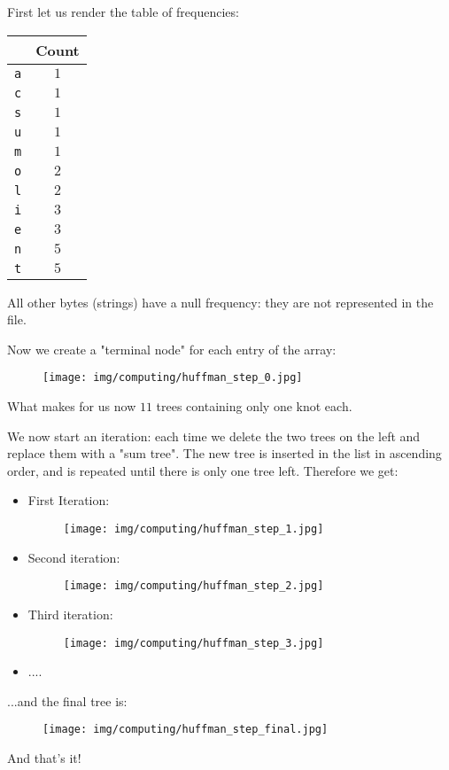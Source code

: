 	First let us render the table of frequencies:
	\begin{table}[H]
		\centering
		\begin{tabular}{|c|c|}
		\hline
		\rowcolor[HTML]{9B9B9B} 
		\multicolumn{1}{|l|}{\cellcolor[HTML]{9B9B9B}\textbf{Letter}} & \multicolumn{1}{l|}{\cellcolor[HTML]{9B9B9B}\textbf{Count}} \\ \hline
		\texttt{a} & $1$ \\ \hline
		\texttt{c} & $1$ \\ \hline
		\texttt{s} & $1$ \\ \hline
		\texttt{u} & $1$ \\ \hline
		\texttt{m} & $1$ \\ \hline
		\texttt{o} & $2$ \\ \hline
		\texttt{l} & $2$ \\ \hline
		\texttt{i} & $3$ \\ \hline
		\texttt{e} & $3$ \\ \hline
		\texttt{n} & $5$ \\ \hline
		\texttt{t} & $5$ \\ \hline
		\end{tabular}
	\end{table}
	All other bytes (strings) have a null frequency: they are not represented in the file.

	Now we create a "terminal node" for each entry of the array:
	\begin{figure}[H]
		\centering
		\texttt{[image: img/computing/huffman\_step\_0.jpg]}
	\end{figure}
	What makes for us now $11$ trees containing only one knot each.

	We now start an iteration: each time we delete the two trees on the left and replace them with a "sum tree". The new tree is inserted in the list in ascending order, and is repeated until there is only one tree left. Therefore we get:
	\begin{itemize}
		\item First Iteration:
		\begin{figure}[H]
			\centering
			\texttt{[image: img/computing/huffman\_step\_1.jpg]}
		\end{figure}
		
		\item Second iteration:
		\begin{figure}[H]
			\centering
			\texttt{[image: img/computing/huffman\_step\_2.jpg]}
		\end{figure}
		
		\item Third iteration:
		\begin{figure}[H]
			\centering
			\texttt{[image: img/computing/huffman\_step\_3.jpg]}
		\end{figure}
		
		\item ....
	\end{itemize}
	...and the final tree is:
	\begin{figure}[H]
		\centering
		\texttt{[image: img/computing/huffman\_step\_final.jpg]}
	\end{figure}
	And that's it!

